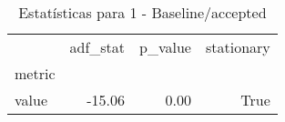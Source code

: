 \begin{table}[htbp]
\caption{Estatísticas para 1 - Baseline/accepted}
\label{tab:1_-_baseline_accepted_adf_test}
\begin{tabular}{lrrr}
\toprule
 & adf_stat & p_value & stationary \\
metric &  &  &  \\
\midrule
value & -15.06 & 0.00 & True \\
\bottomrule
\end{tabular}
\end{table}

